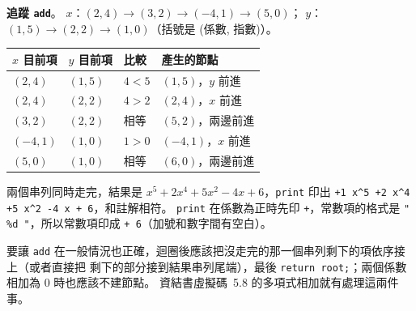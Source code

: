 \begin{pastsoln}
\textbf{追蹤 \texttt{add}}。 $x$：$(2,4) \to (3,2) \to (-4,1) \to (5,0)$；
$y$：$(1,5) \to (2,2) \to (1,0)$（括號是 (係數, 指數)）。
\begin{center}
\begin{tabular}{llll}
\toprule
$x$ 目前項 & $y$ 目前項 & 比較 & 產生的節點 \\
\midrule
$(2,4)$ & $(1,5)$ & $4 < 5$ & $(1,5)$，$y$ 前進 \\
$(2,4)$ & $(2,2)$ & $4 > 2$ & $(2,4)$，$x$ 前進 \\
$(3,2)$ & $(2,2)$ & 相等 & $(5,2)$，兩邊前進 \\
$(-4,1)$ & $(1,0)$ & $1 > 0$ & $(-4,1)$，$x$ 前進 \\
$(5,0)$ & $(1,0)$ & 相等 & $(6,0)$，兩邊前進 \\
\bottomrule
\end{tabular}
\end{center}
兩個串列同時走完，結果是 $x^5 + 2x^4 + 5x^2 - 4x + 6$，\texttt{print} 印出
\texttt{+1 x\^{}5 +2 x\^{}4 +5 x\^{}2 -4 x + 6}，和註解相符。 \texttt{print} 在係數為正時先印
\texttt{+}，常數項的格式是 \texttt{" \%d "}，所以常數項印成 \texttt{+ 6}（加號和數字間有空白）。

要讓 \texttt{add} 在一般情況也正確，迴圈後應該把沒走完的那一個串列剩下的項依序接上（或者直接把
剩下的部分接到結果串列尾端），最後 \texttt{return root;}；兩個係數相加為 $0$ 時也應該不建節點。
資結書虛擬碼~5.8 的多項式相加就有處理這兩件事。
\end{pastsoln}
